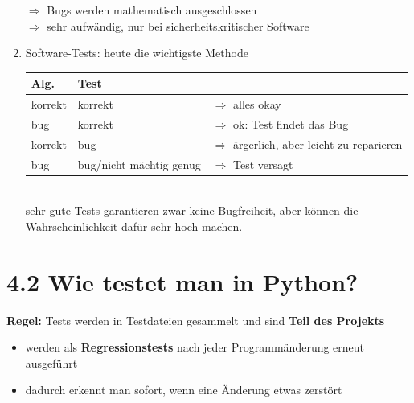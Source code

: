 \documentclass[11pt, fleqn]{scrreprt}
\begin{document}
\begin{enumerate}
        $\Rightarrow$ Bugs werden mathematisch ausgeschlossen \\
        $\Rightarrow$ sehr aufwändig, nur bei sicherheitskritischer Software
        \item Software-Tests: heute die wichtigste Methode \\
        \begin{tabular}{C{2cm} | C{4cm} L{5cm}}
            Alg. & Test & \\ \hline
            korrekt & korrekt & $\Rightarrow$ alles okay\\
            bug & korrekt & $\Rightarrow$ ok: Test findet das Bug\\
            korrekt & bug & $\Rightarrow$ ärgerlich, aber leicht zu reparieren\\
            bug & bug/nicht mächtig genug & $\Rightarrow$ Test versagt \\
        \end{tabular}\\

        sehr gute Tests garantieren zwar keine Bugfreiheit, aber können die Wahrscheinlichkeit dafür sehr hoch machen.
    \end{enumerate}

\section*{4.2 Wie testet man in Python?}
\textbf{Regel:} Tests werden in Testdateien gesammelt und sind \textbf{Teil des Projekts}
\begin{itemize}[label={$\Rightarrow$}]
    \item werden als \textbf{Regressionstests} nach jeder Programmänderung erneut ausgeführt
    \item dadurch erkennt man sofort, wenn eine Änderung etwas zerstört
\end{itemize}
\end{document}
